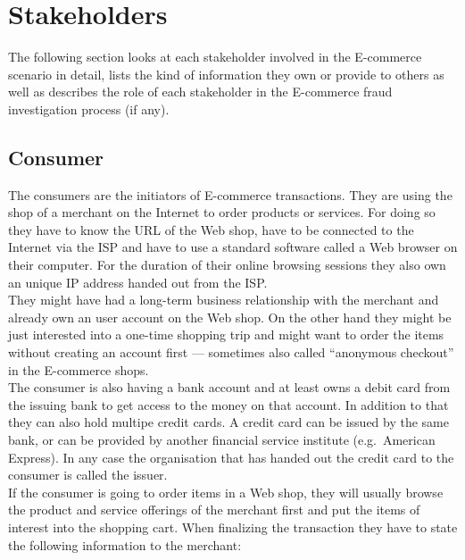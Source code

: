 
\section{Stakeholders}
\label{sec:stakeholder_analysis}

The following section looks at each stakeholder involved in the \gls{E-commerce} scenario in detail, lists the kind of information they own or provide to others as well as describes the role of each stakeholder in the \gls{E-commerce} fraud investigation process (if any).

\subsection{Consumer}
\label{subsec:stakeholder_consumer}

The consumers are the initiators of \gls{E-commerce} transactions. They are using the shop of a merchant on the Internet to order products or services. For doing so they have to know the \gls{URL} of the Web shop, have to be connected to the Internet via the \gls{ISP} and have to use a standard software called a Web browser on their computer. For the duration of their online browsing sessions they also own an unique \gls{IP} address handed out from the \gls{ISP}.\\

They might have had a long-term business relationship with the merchant and already own an user account on the Web shop. On the other hand they might be just interested into a one-time shopping trip and might want to order the items without creating an account first --- sometimes also called ``anonymous checkout'' in the \gls{E-commerce} shops. \\

The consumer is also having a bank account and at least owns a debit card from the issuing bank to get access to the money on that account. In addition to that they can also hold multipe credit cards. A credit card can be issued by the same bank, or can be provided by another financial service institute (e.g.\ American Express). In any case the organisation that has handed out the credit card to the consumer is called the issuer. \\

If the consumer is going to order items in a Web shop, they will usually browse the product and service offerings of the merchant first and put the items of interest into the shopping cart. When finalizing the transaction they have to state the following information to the merchant:\@

